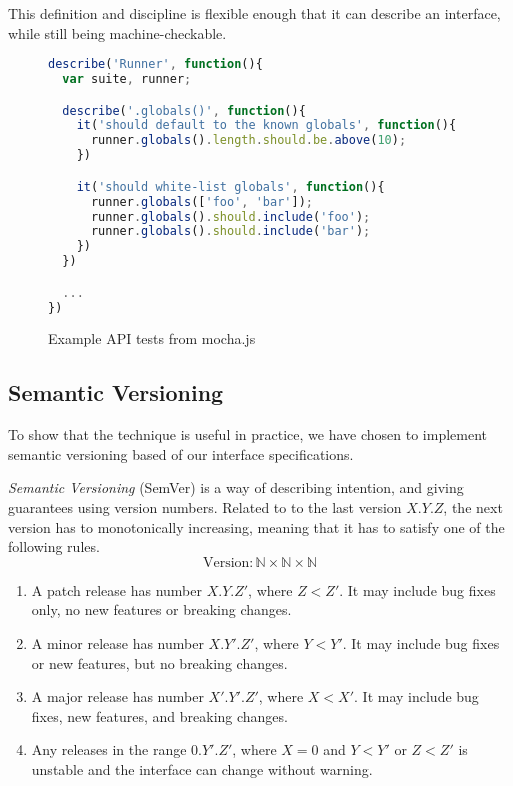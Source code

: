 This definition and discipline is flexible enough that it can describe
an interface, while still being machine-checkable.

\begin{figure*}
\begin{lstlisting}[language=javascript]
describe('Runner', function(){
  var suite, runner;

  describe('.globals()', function(){
    it('should default to the known globals', function(){
      runner.globals().length.should.be.above(10);
    })

    it('should white-list globals', function(){
      runner.globals(['foo', 'bar']);
      runner.globals().should.include('foo');
      runner.globals().should.include('bar');
    })
  })

  ...
})
\end{lstlisting}

\caption{Example API tests from mocha.js}
\label{fig:spec-example}
\end{figure*}

\subsection{Semantic Versioning} \label{sec:semver}

To show that the technique is useful in practice, we have chosen to implement
semantic versioning based of our interface specifications.

\begin{definition}\textit{Semantic Versioning} (SemVer) is a way of describing
intention, and giving guarantees using version numbers\cite{semver}.
Related to to the last version $X.Y.Z$, the next version has to
monotonically increasing, meaning that it has to satisfy one of the
following rules.
$$ \text{Version} : \mathbb{N} \times \mathbb{N} \times \mathbb{N} $$

\begin{enumerate}
    \item A patch release has number $X.Y.Z'$, where $Z < Z'$. It may include
    bug fixes only, no new features or breaking changes.
    
    \item A minor release has number $X.Y'.Z'$, where $Y < Y'$. It may include
    bug fixes or new features, but no breaking changes.
    
    \item A major release has number $X'.Y'.Z'$, where $X < X'$. It may include
    bug fixes, new features, and breaking changes.
    
    \item Any releases in the range $0.Y'.Z'$, where $X = 0$ and $Y < Y'$ or $Z
    < Z'$ is unstable and the interface can change without warning.
\end{enumerate}

\end{definition}

